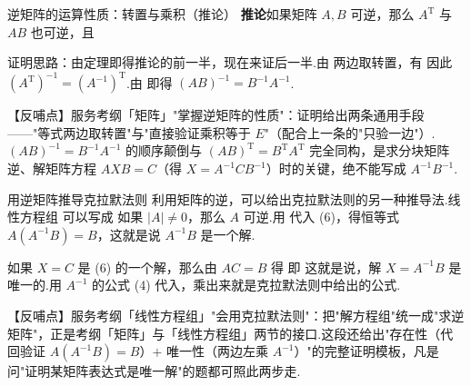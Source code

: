 \begin{fdeep}{逆矩阵的运算性质：转置与乘积（推论）}
\textbf{推论}\quad 如果矩阵 $A,B$ 可逆，那么 $A^{\mathrm{T}}$ 与 $AB$ 也可逆，且

证明思路：由定理即得推论的前一半，现在来证后一半.由
两边取转置，有
因此 $(A^{\mathrm{T}})^{-1}=(A^{-1})^{\mathrm{T}}$.由
即得 $(AB)^{-1}=B^{-1}A^{-1}$.

【反哺点】服务考纲「矩阵」"掌握逆矩阵的性质"：证明给出两条通用手段——"等式两边取转置"与"直接验证乘积等于 $E$"（配合上一条的"只验一边"）.$(AB)^{-1}=B^{-1}A^{-1}$ 的顺序颠倒与 $(AB)^{\mathrm{T}}=B^{\mathrm{T}}A^{\mathrm{T}}$ 完全同构，是求分块矩阵逆、解矩阵方程 $AXB=C$（得 $X=A^{-1}CB^{-1}$）时的关键，绝不能写成 $A^{-1}B^{-1}$.
\end{fdeep}


\begin{fdeep}{用逆矩阵推导克拉默法则}
利用矩阵的逆，可以给出克拉默法则的另一种推导法.线性方程组
可以写成
如果 $|A|\ne 0$，那么 $A$ 可逆.用
代入 (6)，得恒等式 $A(A^{-1}B)=B$，这就是说 $A^{-1}B$ 是一个解.

如果 $X=C$ 是 (6) 的一个解，那么由 $AC=B$ 得
即
这就是说，解 $X=A^{-1}B$ 是唯一的.用 $A^{-1}$ 的公式 (4) 代入，乘出来就是克拉默法则中给出的公式.

【反哺点】服务考纲「线性方程组」"会用克拉默法则"：把"解方程组"统一成"求逆矩阵"，正是考纲「矩阵」与「线性方程组」两节的接口.这段还给出"存在性（代回验证 $A(A^{-1}B)=B$）$+$ 唯一性（两边左乘 $A^{-1}$）"的完整证明模板，凡是问"证明某矩阵表达式是唯一解"的题都可照此两步走.
\end{fdeep}
